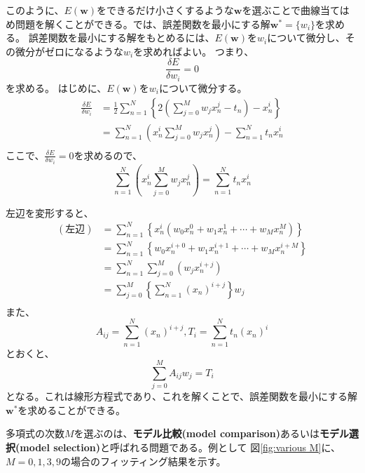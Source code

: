 \documentclass[a4paper,uplatex]{jsarticle}
\numberwithin{equation}{section}
\numberwithin{figure}{section}
\numberwithin{table}{section}
\begin{document}
このように、\(E(\bm{w})\)をできるだけ小さくするような\(\bm{w}\)を選ぶことで曲線当てはめ問題を解くことができる。では、誤差関数を最小にする解\(\bm{w^*}=\{w_i\}\)を求める。
誤差関数を最小にする解をもとめるには、\(E(\bm{w})\)を\(w_i\)について微分し、その微分がゼロになるような\(w_i\)を求めればよい。
つまり、
\begin{equation}
  \frac{\delta E}{\delta w_i} = 0
\end{equation}
を求める。
はじめに、\(E(\bm{w})\)を\(w_i\)について微分する。
\begin{align*}
  \frac{\delta E}{\delta w_i} &= \frac{1}{2}\sum_{n=1}^{N}\left\{2\left(\sum_{j=0}^{M}w_j x_n^j-t_n\right)-x_n^i\right\} \\
                              &= \sum_{n=1}^{N}\left(x_n^i\sum_{j=0}^{M}w_j x_n^j\right) - \sum_{n=1}^{N}t_n x_n^i \\
\end{align*}
ここで、\(\frac{\delta E}{\delta w_i} = 0\)を求めるので、
\begin{equation}
  \sum_{n=1}^{N}\left(x_n^i\sum_{j=0}^{M}w_j x_n^j\right) = \sum_{n=1}^{N}t_n x_n^i
\end{equation}

左辺を変形すると、
\begin{align*}
  (左辺) &= \sum_{n=1}^{N}\left\{x_n^i\left(w_0 x_n^0+w_1x_n^1+\cdots+w_Mx_n^M\right)\right\} \\
         &= \sum_{n=1}^{N}\left\{w_0x_n^{i+0}+w_1x_n^{i+1}+\cdots+w_Mx_n^{i+M}\right\} \\
         &= \sum_{n=1}^{N}\sum_{j=0}^{M}\left(w_jx_n^{i+j}\right) \\
         &= \sum_{j=0}^{M}\left\{\sum_{n=1}^{N}(x_n)^{i+j}\right\}w_j \\
\end{align*}
また、
\begin{equation}
  A_{ij} = \sum_{n=1}^{N}(x_n)^{i+j}, T_i = \sum_{n=1}^{N}t_n(x_n)^i
\end{equation}
とおくと、
\begin{equation}
  \sum_{j=0}^{M}A_{ij}w_j = T_i
\end{equation}
となる。これは線形方程式であり、これを解くことで、誤差関数を最小にする解\(\bm{w^*}\)を求めることができる。

多項式の次数\(M\)を選ぶのは、\textbf{モデル比較(model comparison)}あるいは\textbf{モデル選択(model selection)}と呼ばれる問題である。例として
図\ref{fig:various M}に、\(M=0,1,3,9\)の場合のフィッティング結果を示す。
\end{document}
